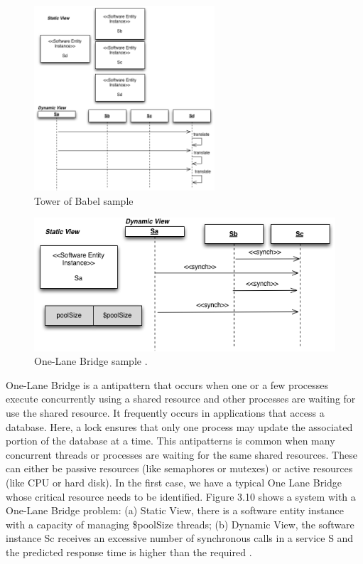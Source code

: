 \begin{figure}[h]
\centering
\includegraphics[width=0.6\textwidth]{./images/babel2.png}
\caption{Tower of Babel sample \cite{Vetoio2011}}
\label{fig:babel}
\end{figure}

\begin{figure}[h]
\centering
\includegraphics[width=1\textwidth]{./images/onelane.png}
\caption{One-Lane Bridge sample \cite{Vetoio2011}.}
\label{fig:onelane}

\end{figure}


One-Lane Bridge is a antipattern that occurs when one or a few processes execute concurrently using a shared resource and other processes are waiting for use the shared resource. It frequently occurs in applications that access a database. Here, a lock ensures that only one process may update the associated portion of the database at a time. This antipatterns is common when many concurrent threads or processes are waiting for the same shared resources. These can either be passive resources (like semaphores or mutexes) or active resources (like CPU or hard disk). In the first case, we have a typical One Lane Bridge whose critical resource needs to be identified. Figure 3.10 shows a system with a One-Lane Bridge problem: (a) Static View, there is a software entity instance with a capacity of managing \$poolSize threads; (b) Dynamic View, the software instance Sc receives an excessive number of synchronous calls in a service S and the predicted response time is higher than the required \cite{Vetoio2011}.



